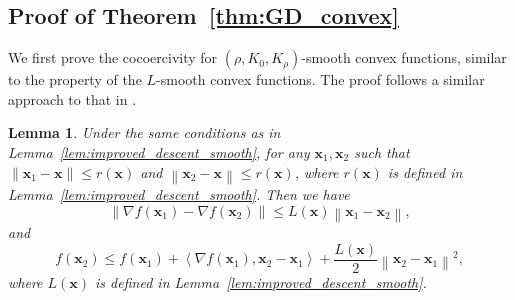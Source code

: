 \documentclass{article}
\newtheorem{lemma}{Lemma}
\newcommand{\Norm}[1]{\left\|#1\right\|}
\newcommand{\dotprod}[2]{\left\langle#1,#2\right\rangle}
\newcommand{\Kr}{K_{\rho}}
\newcommand{\paren}[1]{\left( #1 \right)}
\newcommand{\bx}{\mathbf{x}}
\begin{document}
\subsection{Proof of Theorem~\ref{thm:GD_convex}}
{
We first prove the cocoercivity for $\paren{\rho,K_0,\Kr}$-smooth convex functions, similar to the property of the $L$-smooth convex functions. The proof follows a similar approach to that in \citep{li2023convex}.
}
\begin{lemma}\label{lem:improved_descent_smooth_2}
    Under the same conditions as in Lemma~\ref{lem:improved_descent_smooth}, for any $\bx_1,\bx_2$ such that $\|\bx_1-\bx\|\leq r(\bx)$ and $\Norm{\bx_2-\bx}\leq r(\bx)$, where $r(\bx)$ is defined in Lemma~\ref{lem:improved_descent_smooth}. Then we have
    $$\Norm{\nabla f(\bx_1)-\nabla f(\bx_2) }\leq L(\bx)\Norm{\bx_1-\bx_2},$$
    and 
    $$f(\bx_2)\leq f(\bx_1)+\dotprod{\nabla f(\bx_1)}{\bx_2-\bx_1}+\frac{L(\bx)}{2}\Norm{\bx_2-\bx_1}^2,$$
    where $L(\bx)$ is defined in Lemma~\ref{lem:improved_descent_smooth}.
\end{lemma}
\end{document}
